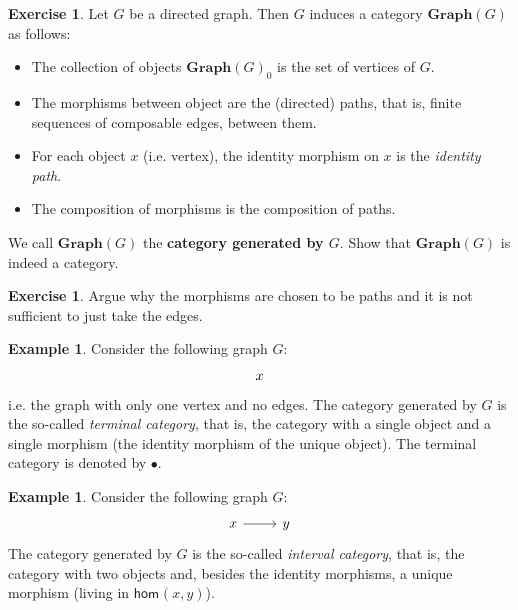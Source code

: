 \documentclass[a4paper,11pt, oneside,titlepage=false]{scrbook}
\theoremstyle{plain}
\theoremstyle{definition}
\newtheorem{exa}[thm]{Example}
\newtheorem{exer}[thm]{Exercise}
\newcommand{\cfont}[1]{\ensuremath{\mathsf{#1}}}
\newcommand{\Ob}[1]{{#1}_0}
\newcommand{\Hom}[3][]{\cfont{hom}_{#1}(#2,#3)}
\begin{document}
\begin{exer} Let $G$ be a directed graph. Then $G$ induces a category $\mathbf{Graph}(G)$ as follows:
\begin{itemize}
\item The collection of objects $\Ob{\mathbf{Graph}(G)}$ is the set of vertices of $G$.
\item The morphisms between object are the (directed) paths, that is, finite sequences of composable edges, between them.
\item For each object $x$ (i.e. vertex), the identity morphism on $x$ is the \textit{identity path}.
\item The composition of morphisms is the composition of paths.
\end{itemize}
We call $\mathbf{Graph}(G)$ the \textbf{category generated by $G$}. Show that $\mathbf{Graph}(G)$ is indeed a category.
\end{exer}

\begin{exer} Argue why the morphisms are chosen to be paths and it is not sufficient to just take the edges.
\end{exer}

\begin{exa}\label{exa:graph_terminalcat} Consider the following graph $G$:
\[
\begin{tikzcd}
x
\end{tikzcd}
\]
i.e. the graph with only one vertex and no edges. The category generated by $G$ is the so-called \textit{terminal category}, that is, the category with a single object and a single morphism (the identity morphism of the unique object).
The terminal category is denoted by $\bullet$.
\end{exa}

\begin{exa}\label{exa:graph_intervalcat} Consider the following graph $G$:
\[
\begin{tikzcd}
x \arrow[r] & y
\end{tikzcd}
\]
The category generated by $G$ is the so-called \textit{interval category}, that is, the category with two objects and, besides the identity morphisms, a unique morphism (living in $\Hom{x}{y}$).
\end{exa}
\end{document}
